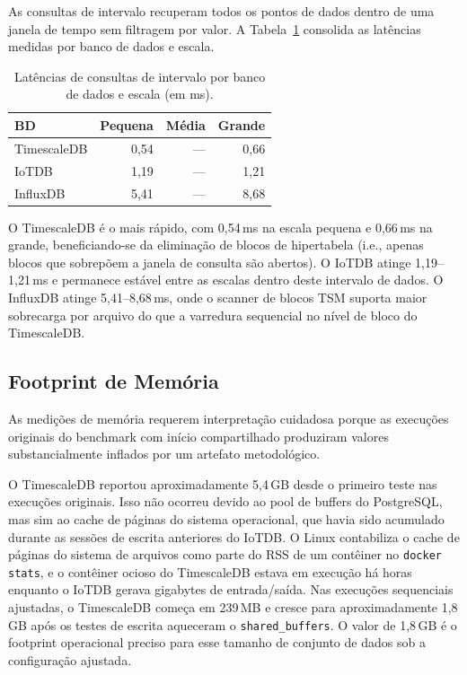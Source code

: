 As consultas de intervalo recuperam todos os pontos de dados dentro de uma janela de tempo
sem filtragem por valor. A Tabela~\ref{tab:range_queries} consolida as latências medidas por
banco de dados e escala.

\begin{table}[ht]
  \centering
  \caption{Latências de consultas de intervalo por banco de dados e escala (em ms).}
  \label{tab:range_queries}
  \begin{tabular}{lrrr}
    \hline
    \textbf{BD} & \textbf{Pequena} & \textbf{Média} & \textbf{Grande} \\
    \hline
    TimescaleDB & 0,54 & --- & 0,66 \\
    IoTDB       & 1,19 & --- & 1,21 \\
    InfluxDB    & 5,41 & --- & 8,68 \\
    \hline
  \end{tabular}
\end{table}

O TimescaleDB é o mais rápido, com 0,54\,ms na escala pequena e 0,66\,ms na grande,
beneficiando-se da eliminação de blocos de hipertabela (i.e., apenas blocos que sobrepõem a janela
de consulta são abertos). O IoTDB atinge 1,19--1,21\,ms e permanece estável entre as escalas
dentro deste intervalo de dados. O InfluxDB atinge
5,41--8,68\,ms, onde o scanner de blocos TSM suporta maior sobrecarga por arquivo do que a
varredura sequencial no nível de bloco do TimescaleDB.

\subsection{Footprint de Memória}
\label{sec:memory-results}

As medições de memória requerem interpretação cuidadosa porque as execuções originais do
benchmark com início compartilhado produziram valores substancialmente inflados por um artefato
metodológico.

O TimescaleDB reportou aproximadamente 5,4\,GB desde o primeiro teste nas execuções
originais. Isso não ocorreu devido ao pool de buffers do PostgreSQL, mas sim ao cache de páginas do sistema operacional, que havia sido acumulado durante as sessões de escrita anteriores do IoTDB. O Linux contabiliza o cache de páginas
do sistema de arquivos como parte do RSS de um contêiner no \texttt{docker stats}, e o
contêiner ocioso do TimescaleDB estava em execução há horas enquanto o IoTDB gerava gigabytes
de entrada/saída. Nas execuções sequenciais ajustadas, o TimescaleDB começa em 239\,MB e cresce para
aproximadamente 1,8\,GB após os testes de escrita aqueceram o \texttt{shared\_buffers}.
O valor de 1,8\,GB é o footprint operacional preciso para esse tamanho de conjunto de dados
sob a configuração ajustada.

